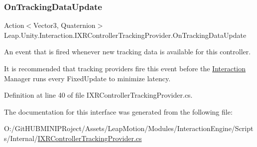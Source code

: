 \subsubsection{\texorpdfstring{OnTrackingDataUpdate}{OnTrackingDataUpdate}}
{\footnotesize\ttfamily Action$<$Vector3, Quaternion$>$ Leap.\+Unity.\+Interaction.\+I\+X\+R\+Controller\+Tracking\+Provider.\+On\+Tracking\+Data\+Update}



An event that is fired whenever new tracking data is available for this controller. 

It is recommended that tracking providers fire this event before the \mbox{\hyperlink{namespace_leap_1_1_unity_1_1_interaction}{Interaction}} Manager runs every Fixed\+Update to minimize latency. 

Definition at line 40 of file I\+X\+R\+Controller\+Tracking\+Provider.\+cs.



The documentation for this interface was generated from the following file\+:\begin{DoxyCompactItemize}
\item 
O\+:/\+Git\+H\+U\+B\+M\+I\+N\+I\+P\+Roject/\+Assets/\+Leap\+Motion/\+Modules/\+Interaction\+Engine/\+Scripts/\+Internal/\mbox{\hyperlink{_i_x_r_controller_tracking_provider_8cs}{I\+X\+R\+Controller\+Tracking\+Provider.\+cs}}\end{DoxyCompactItemize}
